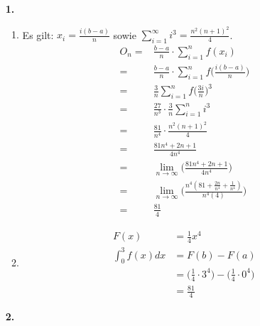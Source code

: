 \documentclass[a4paper]{scrartcl}
\title{\titleinfo}
\author{Elena Noll, Sven-Hendrik Haase, Arne Struck}
\date{\today}
\begin{document}
\maketitle

\begin{enumerate}

\item[\textbf{1.}]
\begin{enumerate}
\item
Es gilt: \(x_i = \frac {i(b-a)} n\) sowie \(\sum\limits_{i=1}^\infty i^3 = \frac {n^2(n+1)^2} 4\).
\begin{align}
O_n =& \frac {b-a} n \cdot \sum\limits_{i=1}^n f(x_i) \\
    =& \frac {b-a} n \cdot \sum\limits_{i=1}^n f\Bigg(\frac {i(b-a)} n\Bigg) \\
    =& \frac 3 n \sum\limits_{i=1}^n f\Bigg(\frac {3i} n \Bigg)^3 \\
    =& \frac {27} {n^3} \cdot \frac 3 n \sum\limits_{i=1}^n i^3 \\
    =& \frac {81} {n^4} \cdot \frac {n^2(n+1)^2} 4 \\
    =& \frac {81n^4+2n+1} {4n^4} \\
    =& \lim\limits_{n\to\infty} \Bigg(\frac {81n^4+2n+1} {4n^4}\Bigg) \\
    =& \lim\limits_{n\to\infty} \Bigg(\frac {n^4(81+\frac {2n} {n^4}+\frac 1 {n^4})} {n^4 (4)}\Bigg) \\
    =& \frac {81} 4
\end{align}

\item
\begin{align}
F(x) &= \frac 1 4 x^4 \\
\int_0^3 f(x)dx &= F(b) - F(a) \\
&= \Bigg(\frac 1 4 \cdot 3^4\Bigg) - \Bigg(\frac 1 4 \cdot 0^4\Bigg) \\
&= \frac {81} 4
\end{align}
\end{enumerate}

\item[\textbf{2.}]
\begin{enumerate}[(i)]


\end{enumerate}
\end{enumerate}
\end{document}
